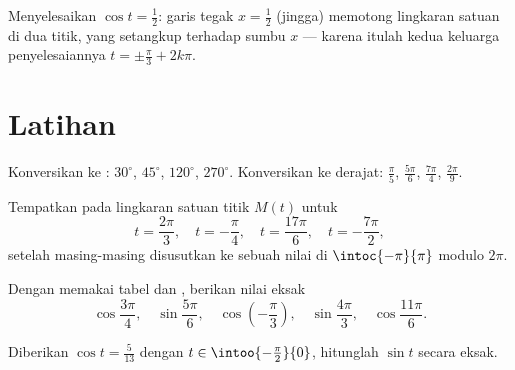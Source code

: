 \begin{omfigure}

{\small Menyelesaikan $\cos t = \frac12$: garis tegak $x = \frac12$
(jingga) memotong lingkaran satuan di dua titik, yang setangkup terhadap
sumbu $x$ --- karena itulah kedua keluarga penyelesaiannya $t = \pm\frac\pi3 + 2k\pi$.}
\end{omfigure}

\section{Latihan}

\begin{exercise}[$\star$]\label{exo:g11:trigo:1}
Konversikan ke : $30^\circ$, $45^\circ$, $120^\circ$, $270^\circ$.
Konversikan ke derajat: $\frac{\pi}{5}$, $\frac{5\pi}{6}$, $\frac{7\pi}{4}$,
$\frac{2\pi}{9}$.
\end{exercise}

\begin{exercise}[$\star$]\label{exo:g11:trigo:2}
Tempatkan pada lingkaran satuan titik $M(t)$ untuk
\[
t = \frac{2\pi}{3},\quad
t = -\frac{\pi}{4},\quad
t = \frac{17\pi}{6},\quad
t = -\frac{7\pi}{2},
\]
setelah masing-masing disusutkan ke sebuah nilai di $\intoc{-\pi}{\pi}$ modulo $2\pi$.
\end{exercise}

\begin{exercise}[$\star$]\label{exo:g11:trigo:3}
Dengan memakai tabel dan , berikan nilai eksak
\[
\cos\frac{3\pi}{4}, \quad
\sin\frac{5\pi}{6}, \quad
\cos\left(-\frac{\pi}{3}\right), \quad
\sin\frac{4\pi}{3}, \quad
\cos\frac{11\pi}{6} .
\]
\end{exercise}

\begin{exercise}[$\star$]\label{exo:g11:trigo:4}
Diberikan $\cos t = \frac{5}{13}$ dengan $t \in \intoo{-\frac\pi2}{0}$,
hitunglah $\sin t$ secara eksak.
\end{exercise}

